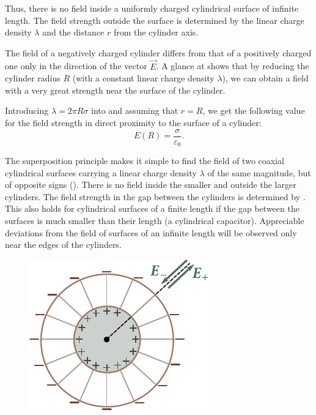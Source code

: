 Thus, there is no field inside a uniformly charged cylindrical surface of infinite length. The field strength outside the surface is determined by the linear charge density $\lambda$ and the distance $r$ from the cylinder axis.

The field of a negatively charged cylinder differs from that of a positively charged one only in the direction of the vector $\vec{E}$. A glance at  shows that by reducing the cylinder radius $R$ (with a constant linear charge density $\lambda$), we can obtain a field with a very great strength near the surface of the cylinder.

Introducing $\lambda=2\pi R\sigma$ into  and assuming that $r=R$, we get the following value for the field strength in direct proximity to the surface of a cylinder:
\vspace{-12pt}
\begin{equation}\label{eq:1_123}
	E(R) = \frac{\sigma}{\varepsilon_0}.
\end{equation}

The superposition principle makes it simple to find the field of two coaxial cylindrical surfaces carrying a linear charge density $\lambda$ of the same magnitude, but of opposite signs (). There is no field inside the smaller and outside the larger cylinders. The field strength in the gap between the cylinders is determined by . This also holds for cylindrical surfaces of a finite length if the gap between the surfaces is much smaller than their length (a cylindrical capacitor). Appreciable deviations from the field of surfaces of an infinite length will be observed only near the edges of the cylinders.

\begin{figure}[t]
	\begin{center}
		\includegraphics[scale=1]{figures/ch_01/fig_1_43.pdf}
		\caption[]{}
		\label{fig:1_43}
	\end{center}
	\vspace{-0.8cm}
\end{figure}

